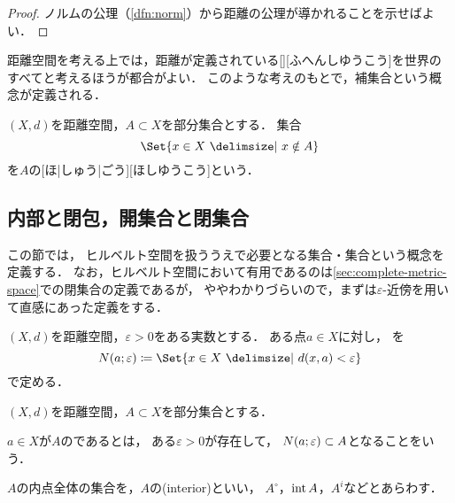 \documentclass[../sotsu.tex]{subfiles}
\begin{document}
\begin{proof}
    ノルムの公理（\cref{dfn:norm}）から距離の公理が導かれることを示せばよい．
\end{proof}

距離空間を考える上では，距離が定義されている[][ふへんしゆうこう]を世界のすべてと考えるほうが都合がよい．
このような考えのもとで，補集合という概念が定義される．

\begin{definition}
    $(X, d)$を距離空間，$A \subset X$を部分集合とする．
    集合
    \begin{equation*}
        \Set{  x \in X  \given  x \notin A  }
    \end{equation*}
    を$A$の[ほ|しゅう|ごう][ほしゆうこう]という．
\end{definition}




\subsection{内部と閉包，開集合と閉集合}
\label{sec:interior-and-closure}

この節では，
ヒルベルト空間を扱ううえで必要となる集合・集合という概念を定義する．
なお，ヒルベルト空間において有用であるのは\cref{sec:complete-metric-space}での閉集合の定義であるが，
ややわかりづらいので，まずは$\varepsilon$-近傍を用いて直感にあった定義をする．


\begin{definition}
    $(X, d)$を距離空間，$\varepsilon > 0$をある実数とする．
    ある点$a \in X$に対し，%
    を
    \begin{equation}
        \neigh(a; \varepsilon) \coloneq \Set{  x \in X  \given  d(x, a) < \varepsilon  }
    \end{equation}
    で定める．
\end{definition}

$(X, d)$を距離空間，$A \subset X$を部分集合とする．

\begin{definition}
    \label{dfn:interior}
    $a \in X$が$A$のであるとは，
    ある$\varepsilon > 0$が存在して，
    $N(a; \varepsilon) \subset A$となることをいう．

    $A$の内点全体の集合を，$A$の(interior)といい，
    $A^\circ$，$\operatorname{int}{A}$，$A^i$などとあらわす．
\end{definition}
\end{document}
